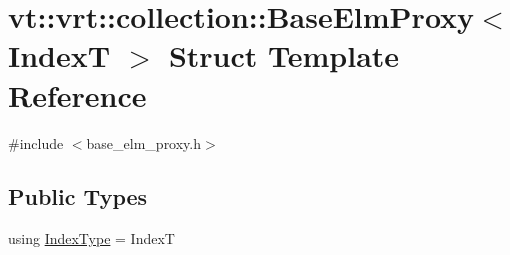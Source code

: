 \hypertarget{structvt_1_1vrt_1_1collection_1_1_base_elm_proxy}{}\section{vt\+:\+:vrt\+:\+:collection\+:\+:Base\+Elm\+Proxy$<$ IndexT $>$ Struct Template Reference}
\label{structvt_1_1vrt_1_1collection_1_1_base_elm_proxy}


{\ttfamily \#include $<$base\+\_\+elm\+\_\+proxy.\+h$>$}

\subsection*{Public Types}
\begin{DoxyCompactItemize}
\item 
using \hyperlink{structvt_1_1vrt_1_1collection_1_1_base_elm_proxy_a3c4ff9fa4edadf3bcaf89f0eefb4c3f6}{Index\+Type} = IndexT
\end{DoxyCompactItemize}
